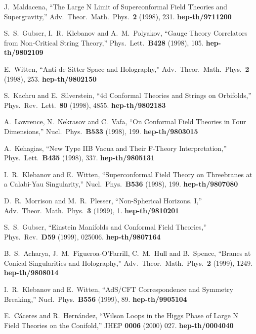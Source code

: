 \documentclass[12pt,epsf,a4paper]{article}
\begin{document}
\begin{thebibliography}{99}


 J.~Maldacena,
``The Large N Limit of Superconformal Field Theories and Supergravity,''
Adv.\ Theor.\ Math.\ Phys.\  {\bf 2} (1998), 231. {\bf hep-th/9711200}

 S.~S.~Gubser, I.~R.~Klebanov and A.~M.~Polyakov,
``Gauge Theory Correlators from Non-Critical String Theory,''
Phys.\ Lett.\  {\bf B428} (1998), 105. {\bf hep-th/9802109}

 E.~Witten,
``Anti-de Sitter Space and Holography,''
Adv.\ Theor.\ Math.\ Phys.\  {\bf 2} (1998), 253. {\bf hep-th/9802150}

 S.~Kachru and E.~Silverstein,
``4d Conformal Theories and Strings on Orbifolds,''
Phys.\ Rev.\ Lett.\  {\bf 80} (1998), 4855. {\bf hep-th/9802183}

A.~Lawrence, N.~Nekrasov and C.~Vafa,
``On Conformal Field Theories in Four Dimensions,''
Nucl.\ Phys.\  {\bf B533} (1998), 199. {\bf hep-th/9803015}

 A.~Kehagias,
``New Type IIB Vacua and Their F-Theory Interpretation,''
Phys.\ Lett.\  {\bf B435} (1998), 337. {\bf hep-th/9805131}

 I.~R.~Klebanov and E.~Witten,
``Superconformal Field Theory on Threebranes at a Calabi-Yau Singularity,''
Nucl.\ Phys.\  {\bf B536} (1998), 199. {\bf hep-th/9807080}

 D.~R.~Morrison and M.~R.~Plesser,
``Non-Spherical Horizons. I,''
Adv.\ Theor.\ Math.\ Phys.\  {\bf 3} (1999), 1. {\bf hep-th/9810201}

 S.~S.~Gubser,
``Einstein Manifolds and Conformal Field Theories,''
Phys.\ Rev.\  {\bf D59} (1999), 025006. {\bf hep-th/9807164}

 B.~S.~Acharya, J.~M.~Figueroa-O'Farrill, C.~M.~Hull and B.~Spence,
``Branes at Conical Singularities and Holography,''
Adv.\ Theor.\ Math.\ Phys.\  {\bf 2} (1999), 1249. {\bf hep-th/9808014}

 I.~R.~Klebanov and E.~Witten,
``AdS/CFT Correspondence and Symmetry Breaking,''
Nucl.\ Phys.\  {\bf B556} (1999), 89. {\bf hep-th/9905104}

E.~C\'aceres and R.~Hern\'andez,
``Wilson Loops in the Higgs Phase of Large N Field Theories on the Conifold,''
JHEP {\bf 0006} (2000) 027. {\bf hep-th/0004040}


\end{thebibliography}
\end{document}
